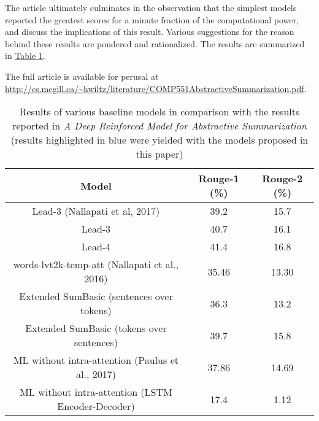 \documentclass[10pt]{article}
\begin{document}
\begin{multicols}{2}
The article ultimately culminates in the observation that the simplest models reported the greatest
scores for a minute fraction of the computational power, and discuss the implications of this
result. Various suggestions for the reason behind these results are pondered and rationalized. The
results are summarized in \hyperref[tab:results]{Table \ref{tab:results}}.

The full article is available for perusal at
\url{http://cs.mcgill.ca/~hwiltz/literature/COMP551AbstractiveSummarization.pdf}.
\end{multicols}
\begin{table}[h]
	\footnotesize
    \begin{center}
        \begin{tabular}{|c|c|c|}
            \hline
            Model & Rouge-1 (\%) & Rouge-2 (\%) \\\hline
            Lead-3 (Nallapati et al, 2017) & 39.2 & 15.7\\\hline
            \color{blue}Lead-3 & \color{blue}40.7 & \color{blue}16.1\\\hline
            \color{blue}Lead-4 & \color{blue}41.4 & \color{blue}16.8\\\hline
            words-lvt2k-temp-att (Nallapati et al., 2016) & 35.46 & 13.30\\\hline
            \color{blue}Extended SumBasic (sentences over tokens) & \color{blue}36.3 & \color{blue}13.2\\\hline
            \color{blue}Extended SumBasic (tokens over sentences) & \color{blue}39.7 & \color{blue}15.8\\\hline
            ML without intra-attention (Paulus et al., 2017) & 37.86 & 14.69\\\hline
			\color{blue}ML without intra-attention (LSTM Encoder-Decoder) & \color{blue}17.4 & \color{blue}1.12
			\color{blue} \\\hline
        \end{tabular}
        \caption{\footnotesize Results of various baseline models in comparison with the results reported in \textit{A Deep Reinforced Model for Abstractive Summarization} \color{blue}(results highlighted in blue were yielded with the models proposed in this paper)}
        \label{tab:results}
    \end{center}
\end{table}
\end{document}
